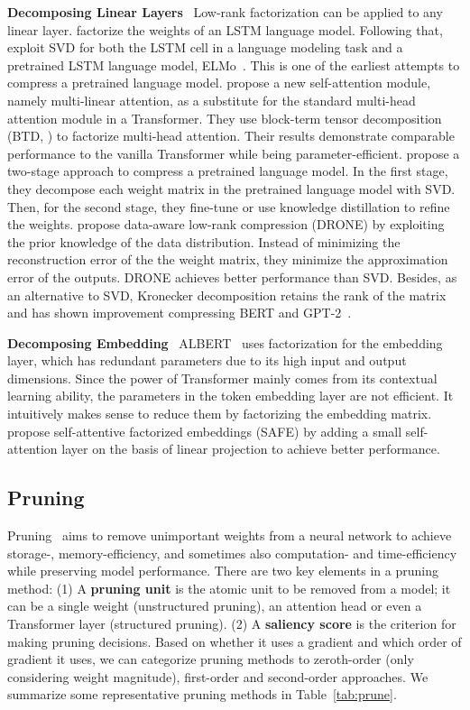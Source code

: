 \documentclass[letterpaper]{article} %
\newcommand{\paratitle}[1]{\noindent\textbf{#1}\ }
\begin{document}
\paratitle{Decomposing Linear Layers} Low-rank factorization can be applied to any linear layer. \citet{grachev2017neural} factorize the weights of an LSTM language model. Following that, \citet{winata2019effectiveness} exploit SVD for both the LSTM cell in a language modeling task and a pretrained LSTM language model, ELMo~\citep{elmo}. This is one of the earliest attempts to compress a pretrained language model. \citet{ma2019tensorized} propose a new self-attention module, namely multi-linear attention, as a substitute for the standard multi-head attention module in a Transformer. They use block-term tensor decomposition (BTD, \citealp{btd}) to factorize multi-head attention. Their results demonstrate comparable performance to the vanilla Transformer while being parameter-efficient. \citet{noach2020compressing} propose a two-stage approach to compress a pretrained language model. In the first stage, they decompose each weight matrix in the pretrained language model with SVD. Then, for the second stage, they fine-tune or use knowledge distillation to refine the weights. \citet{chen2021drone} propose data-aware low-rank compression (DRONE) by exploiting the prior knowledge of the data distribution. Instead of minimizing the reconstruction error of the the weight matrix, they minimize the approximation error of the outputs. DRONE achieves better performance than SVD. Besides, as an alternative to SVD, Kronecker decomposition retains the rank of the matrix and has shown improvement compressing BERT and GPT-2~\citep{tahaei2021kroneckerbert,kroneckergpt}.

\paratitle{Decomposing Embedding} ALBERT~\citep{albert} uses factorization for the embedding layer, which has redundant parameters due to its high input and output dimensions.
Since the power of Transformer mainly comes from its contextual learning ability, the parameters in the token embedding layer are not efficient. It intuitively makes sense to reduce them by factorizing the embedding matrix. \citet{reid2021subformer} propose self-attentive factorized embeddings (SAFE) by adding a small self-attention layer on the basis of linear projection to achieve better performance.

\subsection{Pruning}
\label{sec:pruning}

Pruning~\citep{obd} aims to remove unimportant weights from a neural network to achieve storage-, memory-efficiency, and sometimes also computation- and time-efficiency while preserving model performance. There are two key elements in a pruning method: (1) A \textbf{pruning unit} is the atomic unit to be removed from a model; it can be a single weight (unstructured pruning), an attention head or even a Transformer layer (structured pruning). (2) A \textbf{saliency score} is the criterion for making pruning decisions. Based on whether it uses a gradient and which order of gradient it uses, we can categorize pruning methods to zeroth-order (only considering weight magnitude), first-order and second-order approaches. We summarize some representative pruning methods in Table~\ref{tab:prune}.
\end{document}
